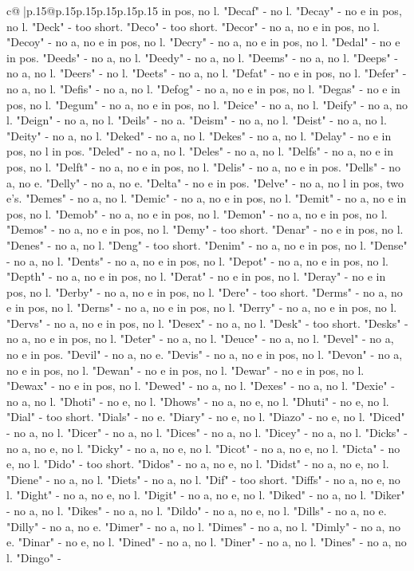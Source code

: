 \documentclass{article}
\begin{document}
{\begin{supertabular}{c@{$\;$}|p{.15\linewidth}@{}p{.15\linewidth}p{.15\linewidth}p{.15\linewidth}p{.15\linewidth}p{.15\linewidth}}
{{{in pos, no l. "Decaf" {-} no l. "Decay" {-} no e in pos, no l. "Deck" {-} too short. "Deco" {-} too short. "Decor" {-} no a, no e in pos, no l. "Decoy" {-} no a, no e in pos, no l. "Decry" {-} no a, no e in pos, no l. "Dedal" {-} no e in pos. "Deeds" {-} no a, no l. "Deedy" {-} no a, no l. "Deems" {-} no a, no l. "Deeps" {-} no a, no l. "Deers" {-} no l. "Deets" {-} no a, no l. "Defat" {-} no e in pos, no l. "Defer" {-} no a, no l. "Defis" {-} no a, no l. "Defog" {-} no a, no e in pos, no l. "Degas" {-} no e in pos, no l. "Degum" {-} no a, no e in pos, no l. "Deice" {-} no a, no l. "Deify" {-} no a, no l. "Deign" {-} no a, no l. "Deils" {-} no a. "Deism" {-} no a, no l. "Deist" {-} no a, no l. "Deity" {-} no a, no l. "Deked" {-} no a, no l. "Dekes" {-} no a, no l. "Delay" {-} no e in pos, no l in pos. "Deled" {-} no a, no l. "Deles" {-} no a, no l. "Delfs" {-} no a, no e in pos, no l. "Delft" {-} no a, no e in pos, no l. "Delis" {-} no a, no e in pos. "Dells" {-} no a, no e. "Delly" {-} no a, no e. "Delta" {-} no e in pos. "Delve" {-} no a, no l in pos, two e's. "Demes" {-} no a, no l. "Demic" {-} no a, no e in pos, no l. "Demit" {-} no a, no e in pos, no l. "Demob" {-} no a, no e in pos, no l. "Demon" {-} no a, no e in pos, no l. "Demos" {-} no a, no e in pos, no l. "Demy" {-} too short. "Denar" {-} no e in pos, no l. "Denes" {-} no a, no l. "Deng" {-} too short. "Denim" {-} no a, no e in pos, no l. "Dense" {-} no a, no l. "Dents" {-} no a, no e in pos, no l. "Depot" {-} no a, no e in pos, no l. "Depth" {-} no a, no e in pos, no l. "Derat" {-} no e in pos, no l. "Deray" {-} no e in pos, no l. "Derby" {-} no a, no e in pos, no l. "Dere" {-} too short. "Derms" {-} no a, no e in pos, no l. "Derns" {-} no a, no e in pos, no l. "Derry" {-} no a, no e in pos, no l. "Dervs" {-} no a, no e in pos, no l. "Desex" {-} no a, no l. "Desk" {-} too short. "Desks" {-} no a, no e in pos, no l. "Deter" {-} no a, no l. "Deuce" {-} no a, no l. "Devel" {-} no a, no e in pos. "Devil" {-} no a, no e. "Devis" {-} no a, no e in pos, no l. "Devon" {-} no a, no e in pos, no l. "Dewan" {-} no e in pos, no l. "Dewar" {-} no e in pos, no l. "Dewax" {-} no e in pos, no l. "Dewed" {-} no a, no l. "Dexes" {-} no a, no l. "Dexie" {-} no a, no l. "Dhoti" {-} no e, no l. "Dhows" {-} no a, no e, no l. "Dhuti" {-} no e, no l. "Dial" {-} too short. "Dials" {-} no e. "Diary" {-} no e, no l. "Diazo" {-} no e, no l. "Diced" {-} no a, no l. "Dicer" {-} no a, no l. "Dices" {-} no a, no l. "Dicey" {-} no a, no l. "Dicks" {-} no a, no e, no l. "Dicky" {-} no a, no e, no l. "Dicot" {-} no a, no e, no l. "Dicta" {-} no e, no l. "Dido" {-} too short. "Didos" {-} no a, no e, no l. "Didst" {-} no a, no e, no l. "Diene" {-} no a, no l. "Diets" {-} no a, no l. "Dif" {-} too short. "Diffs" {-} no a, no e, no l. "Dight" {-} no a, no e, no l. "Digit" {-} no a, no e, no l. "Diked" {-} no a, no l. "Diker" {-} no a, no l. "Dikes" {-} no a, no l. "Dildo" {-} no a, no e, no l. "Dills" {-} no a, no e. "Dilly" {-} no a, no e. "Dimer" {-} no a, no l. "Dimes" {-} no a, no l. "Dimly" {-} no a, no e. "Dinar" {-} no e, no l. "Dined" {-} no a, no l. "Diner" {-} no a, no l. "Dines" {-} no a, no l. "Dingo" {-} }}}
\end{supertabular}}
\end{document}
